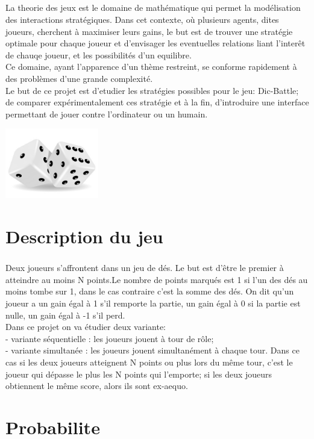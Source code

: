 \documentclass{report}
\begin{document}
  \paragraph{}
  \begin{Large}
  La theorie des jeux est le domaine de mathématique qui permet la modélisation des interactions stratégiques. 
  Dans cet contexte, où plusieurs agents, dites joueurs, cherchent à maximiser leurs gains, le but est de trouver
  une stratégie optimale pour chaque joueur et d'envisager les eventuelles relations liant l'interêt de chauqe 
  joueur, et les possibilités d'un equilibre.\\
  Ce domaine, ayant l'apparence d'un thème restreint, se conforme rapidement à des problèmes d'une grande complexité.\\
  Le but de ce projet est d'etudier les stratégies possibles pour le jeu: Dic-Battle; de comparer expérimentalement ces stratégie
  et à la fin, d'introduire une interface permettant de jouer contre l'ordinateur ou un humain.\\[3.5cm]
  \end{Large}
  \begin{center}
    \includegraphics[width=11em]{de.jpg}\\[30cm]
  \end{center}


  \newpage
  \chapter{Description du jeu}
  \paragraph{}
  \begin{large}
  Deux joueurs s'affrontent dans un jeu de dés. Le but est d'être le premier à atteindre au moins
  N points.Le nombre de points marqués est 1 si l'un des dés au moins tombe sur 1,
  dans le cas contraire c'est la somme des dés. On dit qu'un joueur a un gain égal à 1 s'il remporte la partie, un gain égal
  à 0 si la partie est nulle, un gain égal à -1 s'il perd.\\
  Dans ce projet on va étudier deux variante:\\
  - variante séquentielle : les joueurs jouent à tour de rôle;\\
  - variante simultanée : les joueurs jouent simultanément à chaque tour. Dans ce cas si les
  deux joueurs atteignent N points ou plus lors du même tour, c'est le joueur qui dépasse le
  plus les N points qui l'emporte; si les deux joueurs obtiennent le même score, alors ils sont
  ex-aequo.
  \end{large}

  {\let\clearpage\relax \chapter{Probabilite}}
  

  
\end{document}
